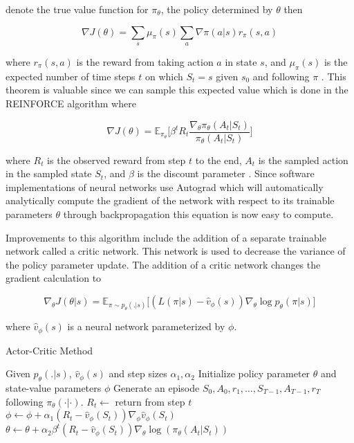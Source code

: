 \documentclass[12pt]{article}
\begin{document}
denote the true value function for $\pi_\theta$, the policy determined by $\theta$ then

\begin{equation*}
  \nabla J(\theta)=\sum_s \mu_\pi(s)\sum_a \nabla \pi(a|s)r_\pi(s,a)
\end{equation*}

where $r_\pi(s,a)$ is the reward from taking action $a$ in state $s$, and $\mu_\pi(s)$ is the expected number of time steps $t$ on which $S_t=s$ given $s_0$ and following $\pi$ \citep{1998_Sutton}. This theorem is valuable since we can sample this expected value which is done in the REINFORCE algorithm where

\begin{equation*}
  \nabla J(\theta)=\mathbb{E}_{\pi_\theta}\bigg[ \beta^tR_t\frac{\nabla_\theta\pi_\theta(A_t|S_t)}{\pi_\theta(A_t|S_t)}\bigg]
\end{equation*}

where $R_t$ is the observed reward from step $t$ to the end, $A_t$ is the sampled action in the sampled state $S_t$, and $\beta$ is the discount parameter \citep{1992_Williams}. Since software implementations of neural networks use Autograd which will automatically analytically compute the gradient of the network with respect to its trainable parameters $\theta$ through backpropagation this equation is now easy to compute.

Improvements to this algorithm include the addition of a separate trainable network called a critic network. This network is used to decrease the variance of the policy parameter update. The addition of a critic network changes the gradient calculation to

\begin{equation*}
  \nabla_\theta J(\theta|s)=\mathbb{E}_{\pi \sim p_\theta(.|s)}\bigg[ (L(\pi|s)-\hat{v}_\phi(s))\nabla_\theta \log p_\theta(\pi|s) \bigg]
\end{equation*}

where $\hat{v}_\phi(s)$ is a neural network parameterized by $\phi$.

\begin{algorithm}[H]
  \caption{Actor-Critic Method}
  \begin{algorithmic}[1]
    \Procedure{}{} Given $p_\theta(.|s)$, $\hat{v}_\phi(s)$ and step sizes $\alpha_1, \alpha_2$
    \State Initialize policy parameter $\theta$ and state-value parameters $\phi$
    \State Generate an episode $S_0, A_0, r_1,\dots,S_{T-1},A_{T-1},r_T$ following $\pi_\theta(\cdot|\cdot)$.
    \State $R_t \leftarrow $ return from step $t$
    \State $\phi \leftarrow \phi + \alpha_1 (R_t-\hat{v}_\phi(S_t) )\nabla_\phi\hat{v}_\phi(S_t)$
    \State $\theta \leftarrow \theta + \alpha_2 \beta^t (R_t-\hat{v}_\phi(S_t) )\nabla_\theta \log(\pi_\theta(A_t|S_t))$
    \EndFor
    \EndWhile
    \EndProcedure
  \end{algorithmic}
\end{algorithm}
\end{document}
